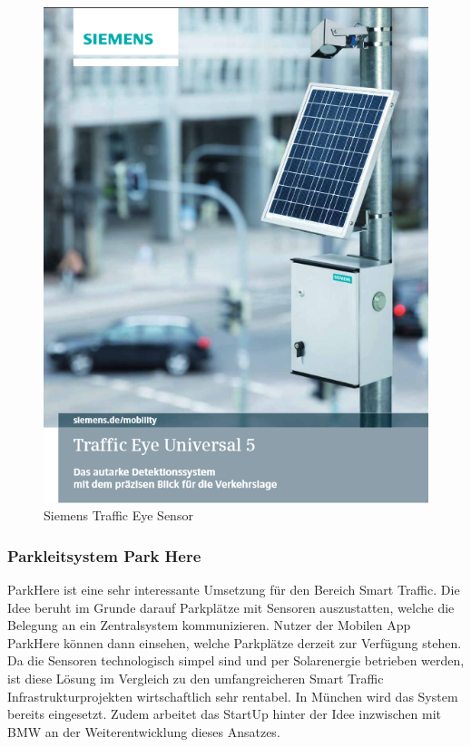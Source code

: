 \begin{figure}[ht]
\begin{center}
\includegraphics[scale=0.3]{images/SiemensTrafficEyeSensor.png}
	\caption{Siemens Traffic Eye Sensor}
	\label{fig14}
\end{center}

\end{figure}

\subsubsection{Parkleitsystem Park Here}
ParkHere ist eine sehr interessante Umsetzung für den Bereich Smart Traffic. Die Idee beruht im Grunde darauf Parkplätze mit Sensoren auszustatten, welche die Belegung an ein Zentralsystem kommunizieren. Nutzer der Mobilen App ParkHere können dann einsehen, welche Parkplätze derzeit zur Verfügung stehen. Da die Sensoren technologisch simpel sind und per Solarenergie betrieben werden, ist diese Lösung im Vergleich zu den umfangreicheren Smart Traffic Infrastrukturprojekten wirtschaftlich sehr rentabel. In München wird das System bereits eingesetzt. Zudem arbeitet das StartUp hinter der Idee inzwischen mit BMW an der Weiterentwicklung dieses Ansatzes.

